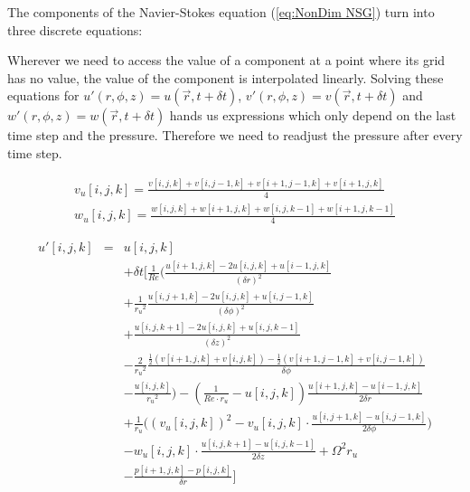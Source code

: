 \documentclass[12pt, a4paper]{article} %
\begin{document}
			The components of the Navier-Stokes equation (\ref{eq:NonDim NSG}) turn into three discrete equations:
			
			Wherever we need to access the value of a component at a point where its grid has no value, the value of the component is interpolated linearly. Solving these equations for $u'(r,\phi,z) = u(\vec{r}, t+\delta t)$, $v'(r,\phi,z) = v(\vec{r}, t+\delta t)$ and $w'(r,\phi,z) = w(\vec{r}, t+\delta t)$ hands us expressions which only depend on the last time step and the pressure. Therefore we need to readjust the pressure after every time step.
			
			\begin{eqnarray}
			 v_u[i,j,k] = \frac{v[i,j,k]+v[i,j-1,k]+v[i+1,j-1,k]+v[i+1,j,k]}{4} \\
			 w_u[i,j,k] = \frac{w[i,j,k]+w[i+1,j,k]+w[i,j,k-1]+w[i+1,j,k-1]}{4}			 
			\end{eqnarray}
			
			
			\begin{eqnarray}
				u'[i,j,k] &=& u[i,j,k]
				\nonumber \\
				&& +\delta t \Bigg[\frac{1}{Re}\bigg(\frac{u[i+1,j,k]-2u[i,j,k]+u[i-1,j,k]}{(\delta r)^2}
				\nonumber \\
				&& + \frac{1}{{r_u}^2}\frac{u[i,j+1,k]-2u[i,j,k]+u[i,j-1,k]}{(\delta \phi)^2}
				\nonumber \\
				&& + \frac{u[i,j,k+1] - 2u[i,j,k] +u[i,j,k-1]}{(\delta z)^2}
				\nonumber \\
				&& - \frac{2}{{r_u}^2}\frac{\frac{1}{2}\left(v[i+1,j,k]+v[i,j,k]\right)-\frac{1}{2}\left(v[i+1,j-1,k]+v[i,j-1,k]\right)}{\delta \phi}
				\nonumber \\
				&& - \frac{u[i,j,k]}{{r_u}^2}\bigg) - \left(\frac{1}{Re\cdot r_u} - u[i,j,k]\right)\frac{u[i+1,j,k]-u[i-1,j,k]}{2\delta r}
				\nonumber \\
				&& + \frac{1}{r_u}\bigg(\left(v_u[i,j,k]\right)^2 - v_u[i,j,k] \cdot \frac{u[i,j+1,k]-u[i,j-1,k]}{2\delta \phi}\bigg)
				\nonumber \\
				&& - w_u[i,j,k] \cdot \frac{u[i,j,k+1]-u[i,j,k-1]}{2\delta z} + \Omega^2 r_u
				\nonumber \\
				&& - \frac{p[i+1,j,k]-p[i,j,k]}{\delta r} \Bigg]
			\end{eqnarray}
\end{document}
